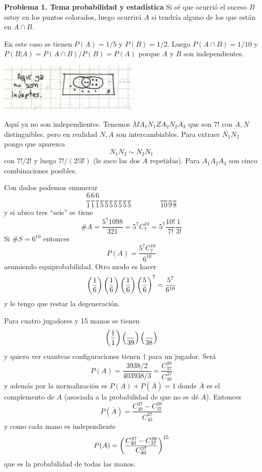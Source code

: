 \documentclass[10pt,oneside]{CBFT_book}
\begin{document}
\begin{ejemplo}{\bf Problema 1. Tema probabilidad y estadística}
Si sé que ocurrió el suceso $B$ estoy en los puntos colorados, luego ocurrirá $A$ si tendría alguno
de los que están en $A\cap B$.

En este caso se tienen $P(A)=1/5$ y $P(B)=1/2$. Luego $P(A\cap B)=1/10$ y 
$P(B|A) = P(A\cap B)/P(B)= P(A)$ porque $A$ y $B$ son independientes.

\includegraphics[width=0.50\textwidth]{images/1606329155.jpg}

Aquí ya no son independientes. Tenemos $M A_1 N_1 Z A_2 N_2 A_3 $ que son $7!$ con $A,N$ distinguibles.
pero en realidad $N,A$ son intercambiables. Para extraer $N_1N_2$ pongo que aparezca
\[
	N_1 N_2 \sim N_2 N_1
\]
con $7!/2!$ y luego $7!/(2!3!)$ (le saco las dos $A$ repetidas). Para $A_1 A_2 A_3$ son cinco 
combinaciones posibles.

Con dados podemos enumerar
\[
	\frac{6}{1} \frac{6}{1} \frac{6}{1} \frac{}{5}  \frac{}{5} 
	 \frac{}{5}  \frac{}{5}  \frac{}{5}  \frac{}{5}  \frac{}{5}
	 \qquad \qquad  \frac{}{10}  \frac{}{9}  \frac{}{8}
\]
y si ubico tres ``seis'' se tiene 
\[
	\# A = \frac{ 5^7 10 9 8 }{3 2 1} = 5^7 C_7^{10} = 5^7 \frac{10!}{7!}\frac{1}{3!}
\]
Si $\# S = 6^{10}$ entonces
\[
	P(A) = \frac{ 5^7 C_7^{10} }{ 6^{10} }
\]
asumiendo equiprobabilidad.
Otro modo es hacer
\[
	\left( \frac{ 1 }{ 6 } \right)\left( \frac{ 1 }{ 6 } \right)\left( \frac{ 1 }{ 6 } \right)\left( \frac{ 5 }{ 6 } \right)^7 = \frac{5^7}{6^{10}}
\]
y le tengo que restar la degeneración.

Para cuatro jugadores y 15 manos se tienen
\[
	\left( \frac{ \dagger }{ 1 } \right) \left( \frac{  }{ 39 } \right) \left( \frac{  }{ 38 } \right)
\]
y quiero ver cuanteas configuraciones tienen $\dagger$ para un jugador. Será
\[
	P(A) = \frac{39 38 /2 }{40 39 38/3} = \frac{ C_{37}^{39} }{ C_{40}^{37} }
\]
y además por la normalización es $ P(A) + P(\bar{A}) = 1$ donde $\bar{A}$ es el complemento de $A$
(asociada a la probabilidad de que no se dé $A$). Entonces
\[
	P(\bar A) =  \frac{ C_{40}^{37} - C_{37}^{39} }{ C_{40}^{37} }
\]
y como cada mano es independiente
\[
	P(A) = \left( \frac{  C_{40}^{37} - C_{37}^{39}  }{  C_{40}^{37}  } \right)^{15}
\]
que es la probabilidad de todas las manos.

\end{ejemplo}



\end{document}
